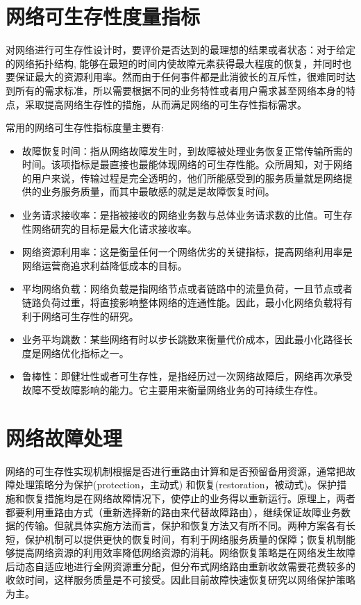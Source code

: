 \section{网络可生存性度量指标}
对网络进行可生存性设计时，要评价是否达到的最理想的结果或者状态：对于给定的网络拓扑结构, 能够在最短的时间内使故障元素获得最大程度的恢复，并同时也要保证最大的资源利用率\cite{wangxiujun2008}。然而由于任何事件都是此消彼长的互斥性，很难同时达到所有的需求标准，所以需要根据不同的业务特性或者用户需求甚至网络本身的特点，采取提高网络生存性的措施，从而满足网络的可生存性指标需求。

常用的网络可生存性指标度量主要有:
\begin{itemize}
  \item 故障恢复时间：指从网络故障发生时，到故障被处理业务恢复正常传输所需的时间。该项指标是最直接也最能体现网络的可生存性能。众所周知，对于网络的用户来说，传输过程是完全透明的，他们所能感受到的服务质量就是网络提供的业务服务质量，而其中最敏感的就是是故障恢复时间。
  \item 业务请求接收率：是指被接收的网络业务数与总体业务请求数的比值。可生存性网络研究的目标是最大化请求接收率。
  \item 网络资源利用率：这是衡量任何一个网络优劣的关键指标，提高网络利用率是网络运营商追求利益降低成本的目标。
  \item 平均网络负载：网络负载是指网络节点或者链路中的流量负荷，一且节点或者链路负荷过重，将直接影响整体网络的连通性能。因此，最小化网络负载将有利于网络可生存性的研究。
  \item 业务平均跳数：某些网络有时以步长跳数来衡量代价成本，因此最小化路径长度是网络优化指标之一。
  \item 鲁棒性：即健壮性或者可生存性，是指经历过一次网络故障后，网络再次承受故障不受故障影响的能力。它主要用来衡量网络业务的可持续生存性。
\end{itemize}



\section{网络故障处理}
网络的可生存性实现机制根据是否进行重路由计算和是否预留备用资源，通常把故障处理策略分为保护(protection，主动式) 和恢复(restoration，被动式)\cite{kvalbein2009multiple}。保护措施和恢复措施均是在网络故障情况下，使停止的业务得以重新运行。原理上，两者都要利用重路由方式（重新选择新的路由来代替故障路由），继续保证故障业务数据的传输。但就具体实施方法而言，保护和恢复方法又有所不同。两种方案各有长短，保护机制可以提供更快的恢复时间，有利于网络服务质量的保障；恢复机制能够提高网络资源的利用效率降低网络资源的消耗。网络恢复策略是在网络发生故障后动态自适应地进行全网资源重分配，但分布式网络路由重新收敛需要花费较多的收敛时间，这样服务质量是不可接受。因此目前故障快速恢复研究以网络保护策略为主。



